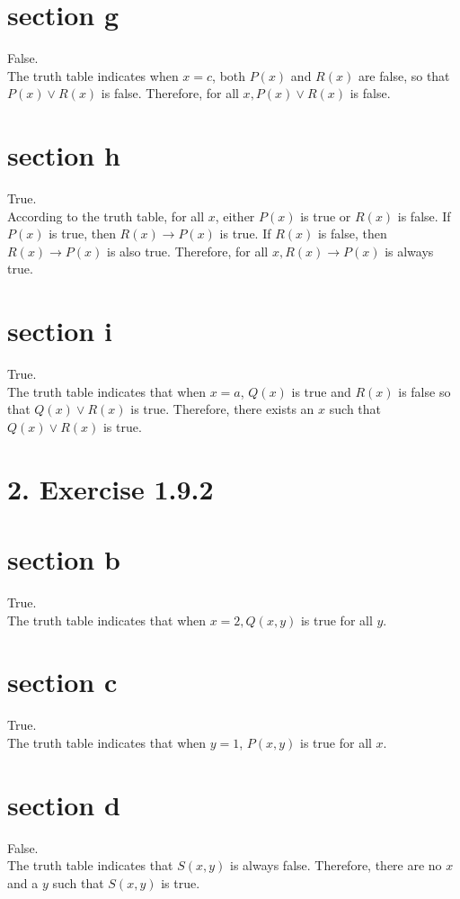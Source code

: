 \documentclass[10pt]{article}
\begin{document}
\section*{section g}
False.\\
The truth table indicates when $x=c$, both $P(x)$ and $R(x)$ are false, so that $P(x) \vee R(x)$ is false. Therefore, for all $x, P(x) \vee R(x)$ is false.

\section*{section h}
True.\\
According to the truth table, for all $x$, either $P(x)$ is true or $R(x)$ is false. If $P(x)$ is true, then $R(x) \rightarrow P(x)$ is true. If $R(x)$ is false, then $R(x) \rightarrow P(x)$ is also true. Therefore, for all $x, R(x) \rightarrow P(x)$ is always true.

\section*{section i}
True.\\
The truth table indicates that when $x=a$, $Q(x)$ is true and $R(x)$ is false so that $Q(x) \vee R(x)$ is true. Therefore, there exists an $x$ such that $Q(x) \vee R(x)$ is true.

\section*{2. Exercise 1.9.2}
\section*{section b}
True.\\
The truth table indicates that when $x=2, Q(x, y)$ is true for all $y$.\\
\section*{section c}
True.\\
The truth table indicates that when $y=1$, $P(x, y)$ is true for all $x$.\\
\section*{section d}
False.\\
The truth table indicates that $S(x, y)$ is always false. Therefore, there are no $x$ and a $y$ such that $S(x, y)$ is true.
\end{document}
